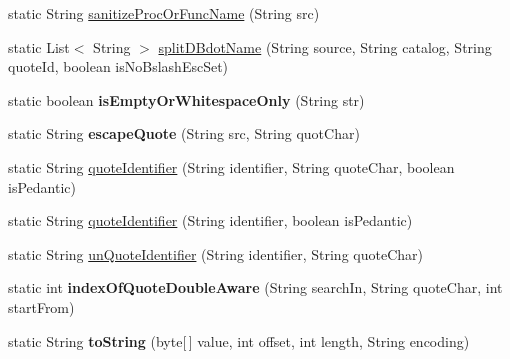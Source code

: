 \begin{DoxyCompactItemize}
\item 
static String \mbox{\hyperlink{classcom_1_1mysql_1_1cj_1_1util_1_1_string_utils_a465f0e5c11f81ab8aab8913e9a3f4e4d}{sanitize\+Proc\+Or\+Func\+Name}} (String src)
\item 
static List$<$ String $>$ \mbox{\hyperlink{classcom_1_1mysql_1_1cj_1_1util_1_1_string_utils_a7070f6928c8a88a95474c4462c6ff8a8}{split\+D\+Bdot\+Name}} (String source, String catalog, String quote\+Id, boolean is\+No\+Bslash\+Esc\+Set)
\item 
\mbox{\label{classcom_1_1mysql_1_1cj_1_1util_1_1_string_utils_a646806a5c4912bb96f50359f64bfb6b7}} 
static boolean {\bfseries is\+Empty\+Or\+Whitespace\+Only} (String str)
\item 
\mbox{\label{classcom_1_1mysql_1_1cj_1_1util_1_1_string_utils_af537620e8a64cf0e1ca40676ca3304bc}} 
static String {\bfseries escape\+Quote} (String src, String quot\+Char)
\item 
static String \mbox{\hyperlink{classcom_1_1mysql_1_1cj_1_1util_1_1_string_utils_a6dc94c9c54c7fe3fafd33cc4d3092ee1}{quote\+Identifier}} (String identifier, String quote\+Char, boolean is\+Pedantic)
\item 
static String \mbox{\hyperlink{classcom_1_1mysql_1_1cj_1_1util_1_1_string_utils_a5ed6d2efb949820c7dc4f24321a42ce6}{quote\+Identifier}} (String identifier, boolean is\+Pedantic)
\item 
static String \mbox{\hyperlink{classcom_1_1mysql_1_1cj_1_1util_1_1_string_utils_aa60f98a2192f4a10b89107f243fd186a}{un\+Quote\+Identifier}} (String identifier, String quote\+Char)
\item 
\mbox{\label{classcom_1_1mysql_1_1cj_1_1util_1_1_string_utils_a2cf45bcafe40519b947e8f0a484d5fbd}} 
static int {\bfseries index\+Of\+Quote\+Double\+Aware} (String search\+In, String quote\+Char, int start\+From)
\item 
\mbox{\label{classcom_1_1mysql_1_1cj_1_1util_1_1_string_utils_a9e0937d1a6aa36ba315334689fa5aa51}} 
static String {\bfseries to\+String} (byte\mbox{[}$\,$\mbox{]} value, int offset, int length, String encoding)
\item 
\mbox{\label{classcom_1_1mysql_1_1cj_1_1util_1_1_string_utils_a9be26e84e45f9349c1de373240562f69}} 

\end{DoxyCompactItemize}
